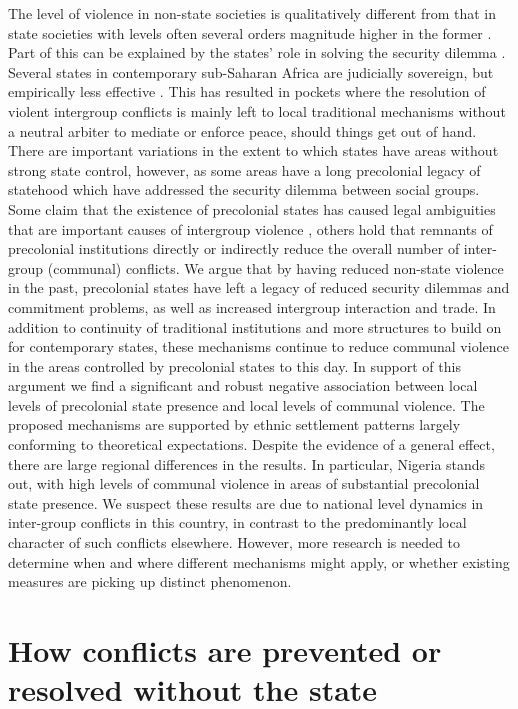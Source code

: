 The level of violence in non-state societies is qualitatively different from
that in state societies with levels often several orders magnitude higher in the
former \citep{diamond2013world, LeBlanc2003, Pinker2012}. Part of this can be
explained by the states’ role in solving the security dilemma \citep{Hobbes,
Lake_1996}. Several states in contemporary sub-Saharan Africa are judicially
sovereign, but empirically less effective \citep{Jackson_1982}. This has
resulted in pockets where the resolution of violent intergroup conflicts is
mainly left to local traditional mechanisms without a neutral arbiter to mediate
or enforce peace, should things get out of hand. There are important variations
in the extent to which states have areas without strong state control, however,
as some areas have a long precolonial legacy of statehood which have addressed
the security dilemma between social groups. Some claim that the existence of
precolonial states has caused legal ambiguities that are important causes of
intergroup violence \citep{Eck2014}, others hold that remnants of precolonial
institutions directly \citep{Herbst2014, Wig2018} or indirectly reduce the
overall number of inter-group (communal) conflicts. We argue that by having
reduced non-state violence in the past, precolonial states have left a legacy of
reduced security dilemmas and commitment problems, as well as increased
intergroup interaction and trade. In addition to continuity of traditional
institutions and more structures to build on for contemporary states, these
mechanisms continue to reduce communal violence in the areas controlled by
precolonial states to this day. In support of this argument we find a
significant and robust negative association between local levels of precolonial
state presence and local levels of communal violence. The proposed mechanisms
are supported by ethnic settlement patterns largely conforming to theoretical
expectations. Despite the evidence of a general effect, there are large regional
differences in the results. In particular, Nigeria stands out, with high levels
of communal violence in areas of substantial precolonial state presence. We
suspect these results are due to national level dynamics in inter-group
conflicts in this country, in contrast to the predominantly local character of
such conflicts elsewhere. However, more research is needed to determine when and
where different mechanisms might apply, or whether existing measures are picking
up distinct phenomenon.

\section{How conflicts are prevented or resolved without the state}
\label{How conflicts are prevented or resolved without the state}

